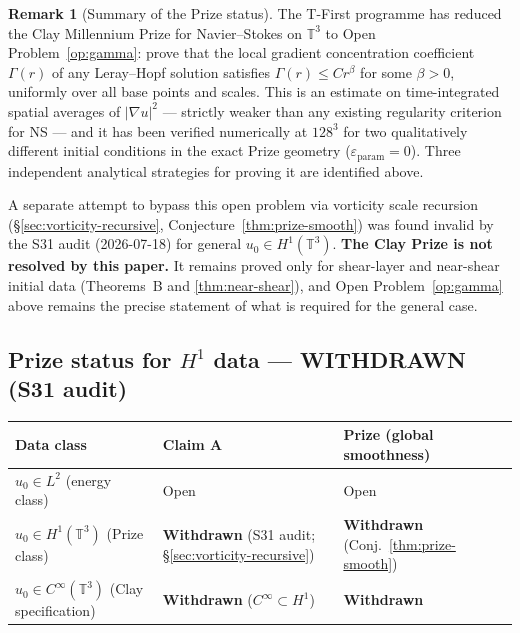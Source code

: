 \documentclass[11pt]{article}
\theoremstyle{definition}
\newtheorem{remark}[theorem]{Remark}
\theoremstyle{remark}
\newcommand{\T}{\mathbb{T}}
\newcommand{\grad}{\nabla}
\newcommand{\eps}{\varepsilon}
\begin{document}
\begin{remark}[Summary of the Prize status]
  The T-First programme has reduced the Clay Millennium Prize for
  Navier--Stokes on $\T^3$ to Open Problem~\ref{op:gamma}: prove that the
  local gradient concentration coefficient $\Gamma(r)$ of any Leray--Hopf
  solution satisfies $\Gamma(r)\leq Cr^\beta$ for some $\beta>0$, uniformly
  over all base points and scales.  This is an estimate on time-integrated
  spatial averages of $|\grad u|^2$ — strictly weaker than any existing
  regularity criterion for NS — and it has been verified numerically at
  $128^3$ for two qualitatively different initial conditions in the exact
  Prize geometry ($\eps_{\mathrm{param}}=0$).  Three independent analytical
  strategies for proving it are identified above.

  A separate attempt to bypass this open problem via vorticity scale
  recursion (§\ref{sec:vorticity-recursive}, Conjecture~\ref{thm:prize-smooth})
  was found invalid by the S31 audit (2026-07-18) for general $u_0\in H^1(\T^3)$.
  \textbf{The Clay Prize is not resolved by this paper.}  It remains proved
  only for shear-layer and near-shear initial data (Theorems~B and
  \ref{thm:near-shear}), and Open Problem~\ref{op:gamma} above remains the
  precise statement of what is required for the general case.
\end{remark}

\subsection{Prize status for $H^1$ data --- WITHDRAWN (S31 audit)}
\label{sec:h1-prize-status}

\begin{center}
\begin{tabular}{@{}lll@{}}
\toprule
Data class & Claim A & Prize (global smoothness) \\
\midrule
$u_0\in L^2$ (energy class) & Open & Open \\
$u_0\in H^1(\T^3)$ (Prize class) & \textbf{Withdrawn} (S31 audit; §\ref{sec:vorticity-recursive}) & \textbf{Withdrawn} (Conj.~\ref{thm:prize-smooth}) \\
$u_0\in C^\infty(\T^3)$ (Clay specification) & \textbf{Withdrawn} ($C^\infty\subset H^1$) & \textbf{Withdrawn} \\
\bottomrule
\end{tabular}
\end{center}
\end{document}
